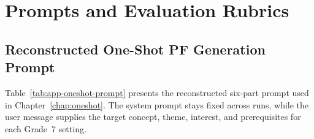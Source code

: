 {\renewcommand{\textfraction}{0.01}
\renewcommand{\bottomfraction}{0.99}
\renewcommand{\floatpagefraction}{0.99}
\chapter{Prompts and Evaluation Rubrics}
\label{app:rubrics-prompts}

\vspace{-2.5em}
\section{Reconstructed One-Shot PF Generation Prompt}
\label{app:oneshot-prompt}
\vspace{-0.4em}
Table~\ref{tab:app-oneshot-prompt} presents the reconstructed six-part prompt used in Chapter~\ref{chap:oneshot}. The system prompt stays fixed across runs, while the user message supplies the target concept, theme, interest, and prerequisites for each Grade~7 setting.

}
